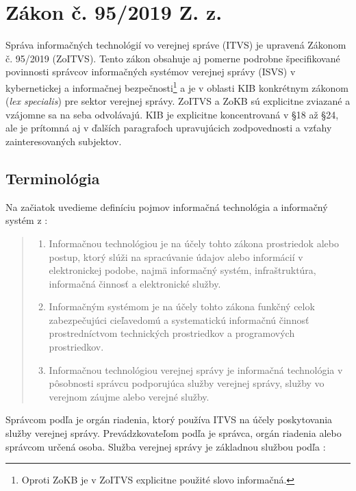 \section{Zákon č. 95/2019 Z. z.}

Správa informačných technológií vo verejnej správe (\acrshort{ITVS}) je upravená Zákonom č. 95/2019 (\acrshort{ZoITVS}).
Tento zákon obsahuje aj pomerne podrobne špecifikované povinnosti správcov informačných systémov verejnej správy (\acrshort{ISVS})
v kybernetickej a informačnej bezpečnosti\footnote{Oproti \acrshort{ZoKB} je v \acrshort{ZoITVS} explicitne použité slovo
informačná.} a je v oblasti \acrshort{KIB} konkrétnym zákonom (\textit{lex specialis}) pre sektor verejnej správy. \acrshort{ZoITVS}
a \acrshort{ZoKB} sú explicitne zviazané a vzájomne sa na seba odvolávajú. \acrshort{KIB} je explicitne koncentrovaná v
\S 18 až \S 24, ale je prítomná aj v ďalších paragrafoch upravujúcich zodpovednosti a vzťahy zainteresovaných subjektov.

\subsection{Terminológia}

Na začiatok uvedieme definíciu pojmov informačná technológia a informačný systém z \cite[\S 2]{95/2019}:

\begin{quote}
  \begin{enumerate}[(1)]
    \item Informačnou technológiou je na účely tohto zákona prostriedok alebo postup, ktorý slúži na spracúvanie údajov alebo
      informácií v elektronickej podobe, najmä informačný systém, infraštruktúra, informačná činnosť a elektronické služby.
    \item Informačným systémom je na účely tohto zákona funkčný celok zabezpečujúci cieľavedomú a systematickú informačnú
      činnosť prostredníctvom technických prostriedkov a programových prostriedkov.
    \item Informačnou technológiou verejnej správy je informačná technológia v pôsobnosti správcu podporujúca služby
      verejnej správy, služby vo verejnom záujme alebo verejné služby. 
  \end{enumerate}
\end{quote}

Správcom podľa\cite[\S 2, ods. (5)]{95/2019} je orgán riadenia, ktorý používa \acrshort{ITVS} na účely poskytovania
služby verejnej správy. Prevádzkovateľom podľa\cite[\S 2, ods. (6)]{95/2019} je správca, orgán riadenia alebo správcom
určená osoba. Služba verejnej správy je základnou službou podľa \cite[\S 3]{95/2019}:

